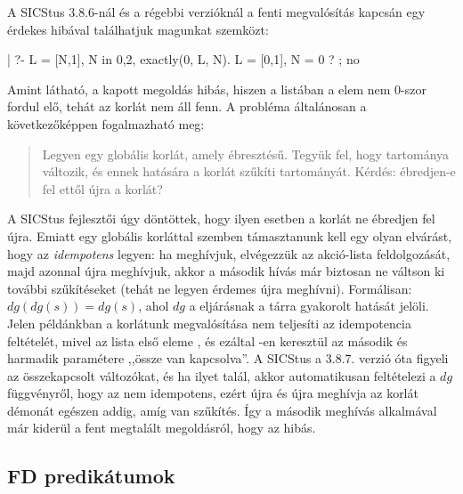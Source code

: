 A SICStus 3.8.6-nál és a régebbi verzióknál a fenti megvalósítás kapcsán egy érdekes
hibával találhatjuk magunkat szemközt:

\begin{prologcode}
| ?- L = [N,1], N in {0,2}, exactly(0, L, N).
L = [0,1], N = 0 ? ;
no
\end{prologcode}

Amint látható, a kapott megoldás hibás, hiszen a \cd{[0,1]} listában a  elem
nem 0-szor fordul elő, tehát az  korlát nem áll fenn. A probléma
általánosan a következőképpen fogalmazható meg:

\begin{quote}
Legyen  egy globális korlát, amely 
ébresztésű. Tegyük fel, hogy  tartománya változik, és ennek hatására
a korlát szűkíti  tartományát. Kérdés: ébredjen-e fel ettől újra a
korlát?
\end{quote}

A SICStus fejlesztői úgy döntöttek, hogy ilyen esetben a korlát ne ébredjen fel újra.
Emiatt egy globális korláttal szemben támasztanunk kell egy olyan elvárást, hogy az
\emph{idempotens} legyen: ha meghívjuk, elvégezzük az akció-lista feldolgozását,
majd azonnal újra meghívjuk, akkor a második hívás már biztosan ne váltson ki további
szűkítéseket (tehát ne legyen érdemes újra meghívni). Formálisan: $dg(dg(s))=dg(s)$,
ahol $dg$ a  eljárásnak a tárra gyakorolt hatását jelöli.
\br
Jelen példánkban a korlátunk megvalósítása nem teljesíti az idempotencia feltételét,
mivel az  lista első eleme , és ezáltal -en keresztül az 
második és harmadik paramétere ,,össze van kapcsolva''. A SICStus a 3.8.7. verzió óta
figyeli az összekapcsolt változókat, és ha ilyet talál, akkor automatikusan feltételezi
a $dg$ függvényről, hogy az nem idempotens, ezért újra és újra meghívja az 
korlát démonát egészen addig, amíg van szűkítés. Így a második meghívás alkalmával
már kiderül a fent megtalált megoldásról, hogy az hibás.

\subsection{FD predikátumok}

\label{fdpred}

